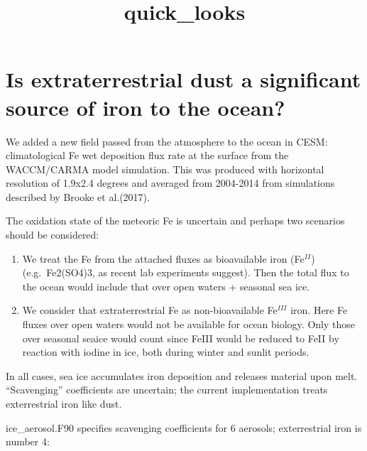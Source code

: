 \documentclass[11pt]{article}
\title{quick\_looks}
\begin{document}
    
    
    \maketitle
    
    

    
    \hypertarget{is-extraterrestrial-dust-a-significant-source-of-iron-to-the-ocean}{%
\section{Is extraterrestrial dust a significant source of iron to the
ocean?}\label{is-extraterrestrial-dust-a-significant-source-of-iron-to-the-ocean}}

We added a new field passed from the atmosphere to the ocean in CESM:
climatological Fe wet deposition flux rate at the surface from the
WACCM/CARMA model simulation. This was produced with horizontal
resolution of 1.9x2.4 degrees and averaged from 2004-2014 from
simulations described by Brooke et al.(2017).

The oxidation state of the meteoric Fe is uncertain and perhaps two
scenarios should be considered:

\begin{enumerate}
\def\labelenumi{\arabic{enumi}.}
\item
  We treat the Fe from the attached fluxes as bioavailable iron
  (Fe\(^{II}\)) (e.g.~Fe2(SO4)3, as recent lab experiments suggest).
  Then the total flux to the ocean would include that over open waters +
  seasonal sea ice.
\item
  We consider that extraterrestrial Fe as non-bioavailable Fe\(^{III}\)
  iron. Here Fe fluxes over open waters would not be available for ocean
  biology. Only those over seasonal seaice would count since FeIII would
  be reduced to FeII by reaction with iodine in ice, both during winter
  and sunlit periods.
\end{enumerate}

In all cases, sea ice accumulates iron deposition and releases material
upon melt. ``Scavenging'' coefficients are uncertain; the current
implementation treats exterrestrial iron like dust.

ice\_aerosol.F90 specifies scavenging coefficients for 6 aerosols;
exterrestrial iron is number 4:
\end{document}
